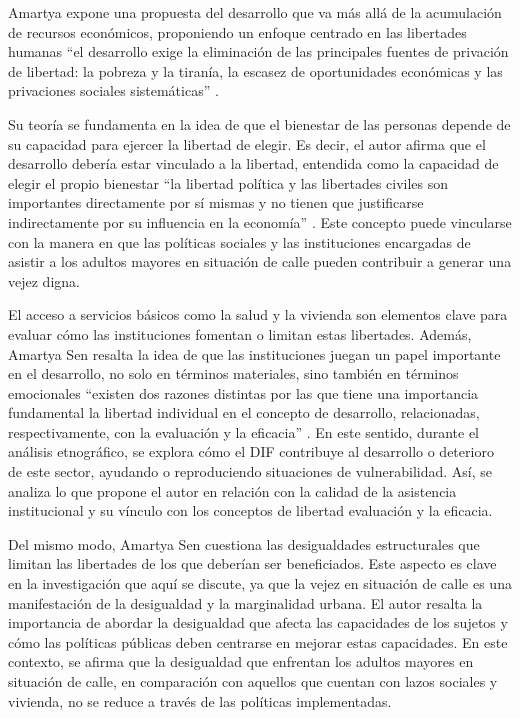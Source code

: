 \documentclass[
  spanish,
  11pt,
  a4paper,
]{scrbook}
\begin{document}
Amartya \textcite{Sen2000} expone una propuesta del desarrollo que va
más allá de la acumulación de recursos económicos, proponiendo un
enfoque centrado en las libertades humanas ``el desarrollo exige la
eliminación de las principales fuentes de privación de libertad: la
pobreza y la tiranía, la escasez de oportunidades económicas y las
privaciones sociales sistemáticas'' \autocite[19]{Sen2000}.

Su teoría se fundamenta en la idea de que el bienestar de las personas
depende de su capacidad para ejercer la libertad de elegir. Es decir, el
autor afirma que el desarrollo debería estar vinculado a la libertad,
entendida como la capacidad de elegir el propio bienestar ``la libertad
política y las libertades civiles son importantes directamente por sí
mismas y no tienen que justificarse indirectamente por su influencia en
la economía'' \autocite[33]{Sen2000}. Este concepto puede vincularse con
la manera en que las políticas sociales y las instituciones encargadas
de asistir a los adultos mayores en situación de calle pueden contribuir
a generar una vejez digna.

El acceso a servicios básicos como la salud y la vivienda son elementos
clave para evaluar cómo las instituciones fomentan o limitan estas
libertades. Además, Amartya Sen resalta la idea de que las instituciones
juegan un papel importante en el desarrollo, no solo en términos
materiales, sino también en términos emocionales ``existen dos razones
distintas por las que tiene una importancia fundamental la libertad
individual en el concepto de desarrollo, relacionadas, respectivamente,
con la evaluación y la eficacia'' \autocite[34]{Sen2000}. En este
sentido, durante el análisis etnográfico, se explora cómo el DIF
contribuye al desarrollo o deterioro de este sector, ayudando o
reproduciendo situaciones de vulnerabilidad. Así, se analiza lo que
propone el autor en relación con la calidad de la asistencia
institucional y su vínculo con los conceptos de libertad evaluación y la
eficacia.

Del mismo modo, Amartya Sen cuestiona las desigualdades estructurales
que limitan las libertades de los que deberían ser beneficiados. Este
aspecto es clave en la investigación que aquí se discute, ya que la
vejez en situación de calle es una manifestación de la desigualdad y la
marginalidad urbana. El autor resalta la importancia de abordar la
desigualdad que afecta las capacidades de los sujetos y cómo las
políticas públicas deben centrarse en mejorar estas capacidades. En este
contexto, se afirma que la desigualdad que enfrentan los adultos mayores
en situación de calle, en comparación con aquellos que cuentan con lazos
sociales y vivienda, no se reduce a través de las políticas
implementadas.
\end{document}
